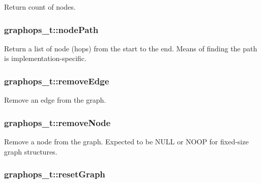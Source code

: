 Return count of nodes. 

\subsubsection[{\texorpdfstring{node\+Path}{nodePath}}]{ graphops\+\_\+t\+::node\+Path}\hypertarget{structgraphops__t_afd2a0b194e922fa656b4352a8fed9e05}{}\label{structgraphops__t_afd2a0b194e922fa656b4352a8fed9e05}


Return a list of node (hops) from the start to the end. Means of finding the path is implementation-\/specific. 

\subsubsection[{\texorpdfstring{remove\+Edge}{removeEdge}}]{ graphops\+\_\+t\+::remove\+Edge}\hypertarget{structgraphops__t_a330cbf9dbf71b84a47ab7ac8a11d71fa}{}\label{structgraphops__t_a330cbf9dbf71b84a47ab7ac8a11d71fa}


Remove an edge from the graph. 

\subsubsection[{\texorpdfstring{remove\+Node}{removeNode}}]{ graphops\+\_\+t\+::remove\+Node}\hypertarget{structgraphops__t_a6f3cb37e537a56ef77622056d7b409d3}{}\label{structgraphops__t_a6f3cb37e537a56ef77622056d7b409d3}


Remove a node from the graph. Expected to be N\+U\+LL or N\+O\+OP for fixed-\/size graph structures. 

\subsubsection[{\texorpdfstring{reset\+Graph}{resetGraph}}]{ graphops\+\_\+t\+::reset\+Graph}\hypertarget{structgraphops__t_a5e4e69eeeb8e25607c3af5dfcdbb88aa}{}\label{structgraphops__t_a5e4e69eeeb8e25607c3af5dfcdbb88aa}


